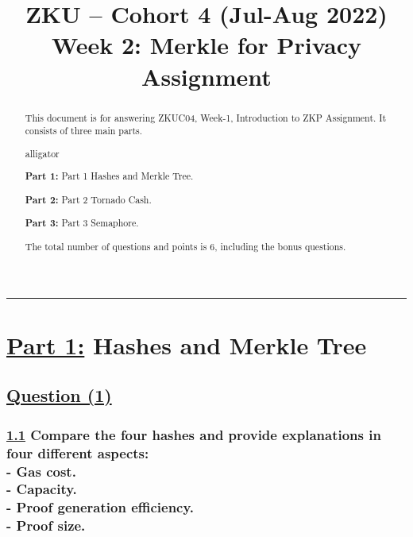 \documentclass[letterpaper, 10 pt, conference]{ieeeconf}  %
\title{\LARGE \bf
ZKU – Cohort 4 (Jul-Aug 2022)\\Week 2: Merkle for Privacy\\Assignment \sharp 2}
\author{Iskander Andrews$^{1}$%
\thanks{\faIcon[regular]{envelope} \tt\small iskander.s.andrews@gmail.com}
\thanks{\faIcon{discord} \tt\small Isk#0996}
\thanks{\faIcon{github} \tt\small iskdrews}}
\begin{document}
\maketitle
\thispagestyle{empty}
\pagestyle{empty}


\begin{abstract}

This document is for answering ZKUC04, Week-1, Introduction to ZKP Assignment.
It consists of three main parts.
\begin{labeling}{alligator}
\item [\textbf{Part 1:}] Part 1 Hashes and Merkle Tree.
\item [\textbf{Part 2:}] Part 2 Tornado Cash.
\item [\textbf{Part 3:}] Part 3 Semaphore.
\end{labeling}

The total number of questions and points is $6$, including the bonus questions. 
\end{abstract}

\noindent\rule{8cm}{0.4pt}

\section{\textbf{\underline{Part 1:}} Hashes and Merkle Tree}
\subsection{\textbf{\underline{Question (1)}}}
\subsubsection{\textbf{\underline{1.1} Compare the four hashes and provide explanations in four different aspects: \\ 
- Gas cost. \\ 
- Capacity.\\ 
- Proof generation efficiency.\\
- Proof size.}}
\end{document}
